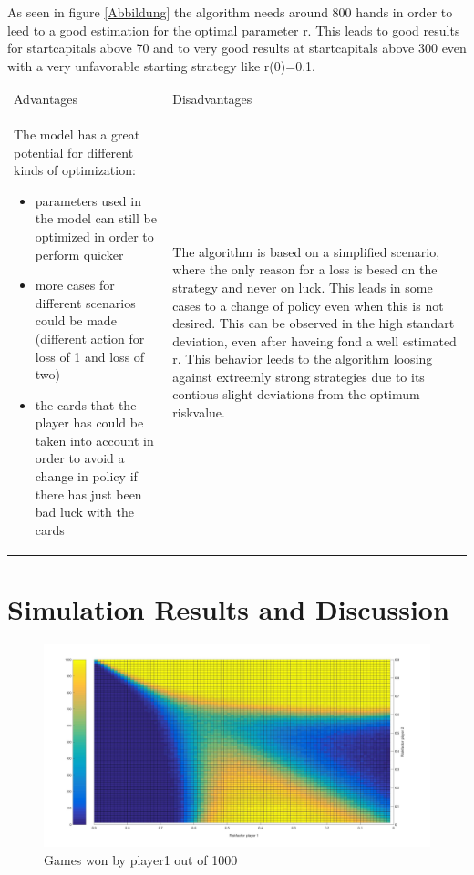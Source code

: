 \documentclass[11pt]{article}
\begin{document}
As seen in figure \ref{Abbildung} the algorithm needs around 800 hands in order to leed to a good estimation for the optimal parameter r. This leads to good results for startcapitals above 70 and to very good results at startcapitals above 300 even with a very unfavorable starting strategy like r(0)=0.1.
\\
\begin{tabular}{ p{7.2cm}  p{7.2cm}}
Advantages & Disadvantages\\
The model has a great potential for different kinds of optimization:
\begin{itemize}
\item parameters used in the model can still be optimized in order to perform quicker
\item more cases for different scenarios could be made (different action for loss of 1 and loss of two)
\item the cards that the player has could be taken into account in order to avoid a change in policy if there has just been bad luck with the cards 
\end{itemize}
 & The algorithm is based on a simplified scenario, where the only reason for a loss is besed on the strategy and never on luck. This leads in some cases to a change of policy even when this is not desired. This can be observed in the high standart deviation, even after haveing fond a well estimated r. This behavior leeds to the algorithm loosing against extreemly strong strategies due to its contious slight deviations from the optimum  riskvalue.\\ 
\end{tabular}



\section{Simulation Results and Discussion}
\begin{figure}
\begin{center}


\includegraphics[scale=0.2]{Graphics/allDataPlot_BlindOn_1000Games_001Step_TopFlat.jpg}
\caption{Games won by player1 out of 1000\label{Topview of all Data}}
\end{center}
\end{figure}
\end{document}
